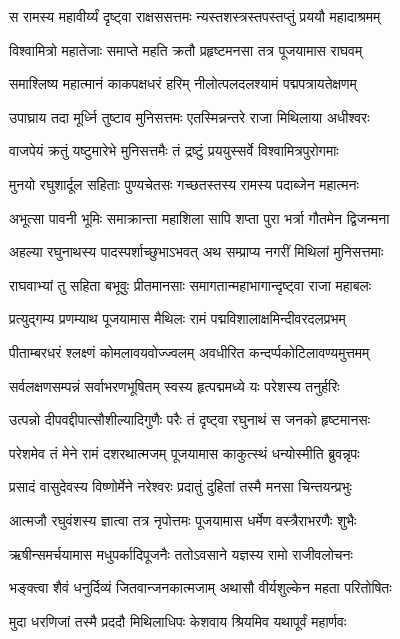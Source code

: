 \twolineshloka
{स रामस्य महावीर्य्यं दृष्ट्वा राक्षससत्तमः}
{न्यस्तशस्त्रस्तपस्तप्तुं प्रययौ महादाश्रमम्}%

\twolineshloka
{विश्वामित्रो महातेजाः समाप्ते महति क्रतौ}
{प्रहृष्टमनसा तत्र पूजयामास राघवम्}%

\twolineshloka
{समाश्लिष्य महात्मानं काकपक्षधरं हरिम्}
{नीलोत्पलदलश्यामं पद्मपत्रायतेक्षणम्}%

\twolineshloka
{उपाघ्राय तदा मूर्ध्नि तुष्टाव मुनिसत्तमः}
{एतस्मिन्नन्तरे राजा मिथिलाया अधीश्वरः}%

\twolineshloka
{वाजपेयं क्रतुं यष्टुमारेभे मुनिसत्तमैः}
{तं द्रष्टुं प्रययुस्सर्वे विश्वामित्रपुरोगमाः}%

\twolineshloka
{मुनयो रघुशार्दूल सहिताः पुण्यचेतसः}
{गच्छतस्तस्य रामस्य पदाब्जेन महात्मनः}%

\twolineshloka
{अभूत्सा पावनी भूमिः समाक्रान्ता महाशिला}
{सापि शप्ता पुरा भर्त्रा गौतमेन द्विजन्मना}%

\twolineshloka
{अहल्या रघुनाथस्य पादस्पर्शाच्छुभाऽभवत्}
{अथ सम्प्राप्य नगरीं मिथिलां मुनिसत्तमाः}%

\twolineshloka
{राघवाभ्यां तु सहिता बभूवुः प्रीतमानसाः}
{समागतान्महाभागान्दृष्ट्वा राजा महाबलः}%

\twolineshloka
{प्रत्युद्गम्य प्रणम्याथ पूजयामास मैथिलः}
{रामं पद्मविशालाक्षमिन्दीवरदलप्रभम्}%

\twolineshloka
{पीताम्बरधरं श्लक्ष्णं कोमलावयवोज्ज्वलम्}
{अवधीरित कन्दर्प्पकोटिलावण्यमुत्तमम्}%

\twolineshloka
{सर्वलक्षणसम्पन्नं सर्वाभरणभूषितम्}
{स्वस्य हृत्पद्ममध्ये यः परेशस्य तनुर्हरिः}%

\twolineshloka
{उत्पन्नो दीपवद्दीपात्सौशील्यादिगुणैः परैः}
{तं दृष्ट्वा रघुनाथं स जनको हृष्टमानसः}%

\twolineshloka
{परेशमेव तं मेने रामं दशरथात्मजम्}
{पूजयामास काकुत्स्थं धन्योस्मीति ब्रुवन्नृपः}%

\twolineshloka
{प्रसादं वासुदेवस्य विष्णोर्मेने नरेश्वरः}
{प्रदातुं दुहितां तस्मै मनसा चिन्तयन्प्रभुः}%

\twolineshloka
{आत्मजौ रघुवंशस्य ज्ञात्वा तत्र नृपोत्तमः}
{पूजयामास धर्मेण वस्त्रैराभरणैः शुभैः}%

\twolineshloka
{ऋषीन्समर्चयामास मधुपर्कादिपूजनैः}
{ततोऽवसाने यज्ञस्य रामो राजीवलोचनः}%

\twolineshloka
{भङ्क्त्वा शैवं धनुर्दिव्यं जितवान्जनकात्मजाम्}
{अथासौ वीर्यशुल्केन महता परितोषितः}%

\twolineshloka
{मुदा धरणिजां तस्मै प्रददौ मिथिलाधिपः}
{केशवाय श्रियमिव यथापूर्वं महार्णवः}%

